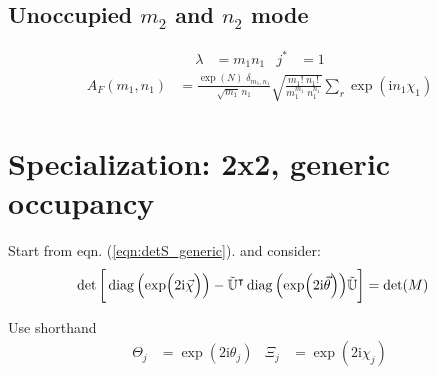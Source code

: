 \documentclass[
	english,
	a4paper,
	fontsize=10pt,
	parskip=half,
	titlepage=true,
	DIV=12,
	final
]{scrreprt}
\newcommand*{\transp}{\ensuremath{^\intercal}}
\newcommand*{\iunit}{\ensuremath{\mathrm{i}}}
\DeclareMathOperator{\diag}{diag}
\begin{document}
\subsection{Unoccupied $m_2$ and $n_2$ mode}
\begin{align}
	\lambda &= m_1 n_1
&
	j^* &= 1
\end{align}
\begin{align}
	A_F(m_1, n_1)
&=
	\frac
		{\exp(N) \; \delta_{m_1,n_1}}
		{\sqrt{m_1} \, n_1}
	\sqrt{\frac
		{ m_1!      \; n_1! }
		{ m_1^{m_1} \; n_1^{n_1} }
	}
	\sum_r
		\exp( \iunit n_1 \chi_1 )
\end{align}

\section{Specialization: 2x2, generic occupancy}
Start from eqn. (\ref{eqn:detS_generic}). and consider:
\begin{align*}
	\det\qty[\bigg.
		\diag\qty(\exp(\Big.2\iunit\vec{\chi}))
		-
		\tilde{\mathbb{U}}\transp
		\diag\qty(\exp(2\iunit\vec{\theta}))
		\tilde{\mathbb{U}}
	]
&=
	\det(M)
\end{align*}

Use shorthand
\begin{align}
	\Theta_j &= \exp(2\iunit \theta_j)
&
	\Xi_j &= \exp(2\iunit \chi_j)
\end{align}
\end{document}
